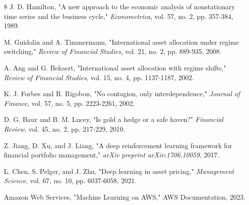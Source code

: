 \documentclass[conference]{IEEEtran}
\begin{document}
\begin{thebibliography}{8}
 J. D. Hamilton, "A new approach to the economic analysis of nonstationary time series and the business cycle," \textit{Econometrica}, vol. 57, no. 2, pp. 357-384, 1989.

 M. Guidolin and A. Timmermann, "International asset allocation under regime switching," \textit{Review of Financial Studies}, vol. 21, no. 2, pp. 889-935, 2008.

 A. Ang and G. Bekaert, "International asset allocation with regime shifts," \textit{Review of Financial Studies}, vol. 15, no. 4, pp. 1137-1187, 2002.

 K. J. Forbes and R. Rigobon, "No contagion, only interdependence," \textit{Journal of Finance}, vol. 57, no. 5, pp. 2223-2261, 2002.

 D. G. Baur and B. M. Lucey, "Is gold a hedge or a safe haven?" \textit{Financial Review}, vol. 45, no. 2, pp. 217-229, 2010.

 Z. Jiang, D. Xu, and J. Liang, "A deep reinforcement learning framework for financial portfolio management," \textit{arXiv preprint arXiv:1706.10059}, 2017.

 L. Chen, S. Pelger, and J. Zhu, "Deep learning in asset pricing," \textit{Management Science}, vol. 67, no. 10, pp. 6037-6058, 2021.

 Amazon Web Services, "Machine Learning on AWS," AWS Documentation, 2023.
\end{thebibliography}
\end{document}
